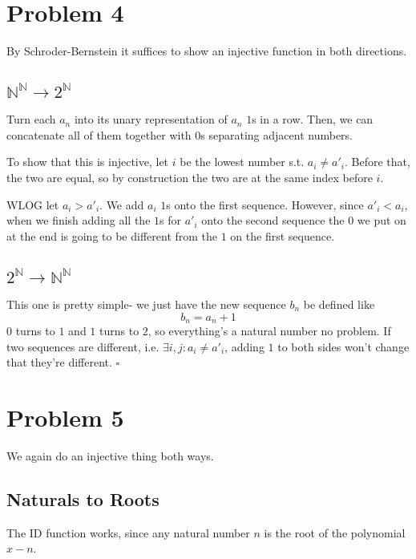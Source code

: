 \documentclass[12pt]{article}
\newcommand{\N}{\mathbb{N}}
\begin{document}
\pagebreak

\section{Problem 4}

By Schroder-Bernstein it suffices to show an injective function in both directions.

\subsection{\texorpdfstring{$\N^\N \to 2^\N$}{N\^N to 2\^N}}

Turn each $a_n$ into its unary representation of $a_n$ $1$s in a row.
Then, we can concatenate all of them together with $0$s separating adjacent numbers.

To show that this is injective, let $i$ be the lowest number s.t. $a_i \ne a'_i$.
Before that, the two are equal, so by construction the two are at the same index before $i$.

WLOG let $a_i > a'_i$.
We add $a_i$ $1$s onto the first sequence.
However, since $a'_i < a_i$, when we finish adding all the $1$s for $a'_i$ onto
the second sequence the $0$ we put on at the end is going to be different
from the $1$ on the first sequence.

\subsection{\texorpdfstring{$2^\N \to \N^\N$}{2\^N to N\^N}}

This one is pretty simple- we just have the new sequence $b_n$ be defined like
\[b_n=a_n+1\]
$0$ turns to $1$ and $1$ turns to $2$, so everything's a natural number no problem.
If two sequences are different, i.e. $\exists i, j: a_i \ne a'_i$,
adding $1$ to both sides won't change that they're different. $\square$

\pagebreak

\section{Problem 5}

We again do an injective thing both ways.

\subsection{Naturals to Roots}

The ID function works, since any natural number $n$ is the root of the polynomial $x-n$.
\end{document}
